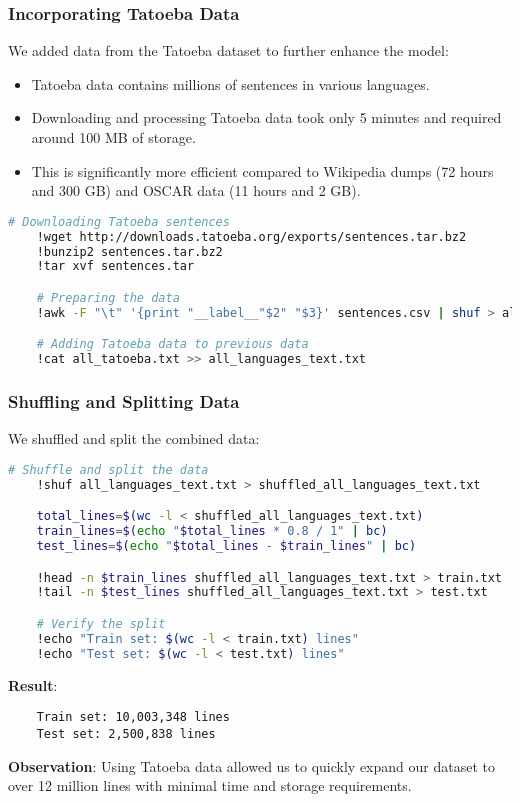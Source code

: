 \documentclass{beamer}
\begin{document}
\begin{frame}[fragile]
    \frametitle{Incorporating Tatoeba Data}
    We added data from the Tatoeba dataset to further enhance the model:

    \begin{itemize}
        \item Tatoeba data contains millions of sentences in various languages.
        \item Downloading and processing Tatoeba data took only 5 minutes and required around 100 MB of storage.
        \item This is significantly more efficient compared to Wikipedia dumps (72 hours and 300 GB) and OSCAR data (11 hours and 2 GB).
    \end{itemize}

    \begin{lstlisting}[language=bash]
    # Downloading Tatoeba sentences
    !wget http://downloads.tatoeba.org/exports/sentences.tar.bz2
    !bunzip2 sentences.tar.bz2
    !tar xvf sentences.tar

    # Preparing the data
    !awk -F "\t" '{print "__label__"$2" "$3}' sentences.csv | shuf > all_tatoeba.txt

    # Adding Tatoeba data to previous data
    !cat all_tatoeba.txt >> all_languages_text.txt
    \end{lstlisting}
\end{frame}

\begin{frame}[fragile]
    \frametitle{Shuffling and Splitting Data}
    We shuffled and split the combined data:

    \begin{lstlisting}[language=bash]
    # Shuffle and split the data
    !shuf all_languages_text.txt > shuffled_all_languages_text.txt

    total_lines=$(wc -l < shuffled_all_languages_text.txt)
    train_lines=$(echo "$total_lines * 0.8 / 1" | bc)
    test_lines=$(echo "$total_lines - $train_lines" | bc)

    !head -n $train_lines shuffled_all_languages_text.txt > train.txt
    !tail -n $test_lines shuffled_all_languages_text.txt > test.txt

    # Verify the split
    !echo "Train set: $(wc -l < train.txt) lines"
    !echo "Test set: $(wc -l < test.txt) lines"
    \end{lstlisting}

    \textbf{Result}:
    \begin{lstlisting}
    Train set: 10,003,348 lines
    Test set: 2,500,838 lines
    \end{lstlisting}

    \textbf{Observation}: Using Tatoeba data allowed us to quickly expand our dataset to over 12 million lines with minimal time and storage requirements.
\end{frame}
\end{document}
